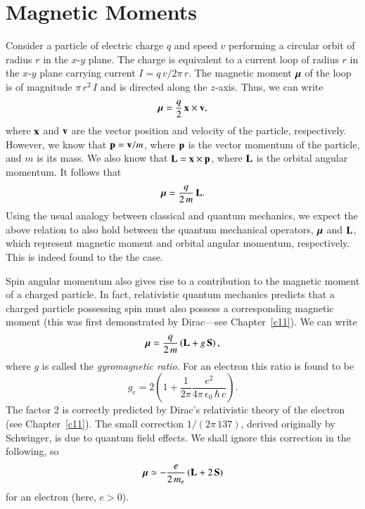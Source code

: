 \section{Magnetic Moments}\label{s5.5c}
Consider a particle of electric charge $q$ and speed $v$
performing  a  circular orbit of radius $r$ 
in the $x$-$y$ plane. The charge is equivalent to a current loop of radius $r$
in the $x$-$y$ plane carrying  current $I=q\,v/2\pi\, r$. The magnetic moment
$\mbox{\boldmath$\mu$}$  of
the loop is of magnitude $\pi\,  r^2\, I$ and is directed along the $z$-axis.
Thus, we can write
\begin{equation}
\mbox{\boldmath$\mu$} = \frac{q}{2}\, {\bf x} \times {\bf v},
\end{equation}
where ${\bf x}$ and ${\bf v}$ are the vector position and velocity of the particle,
respectively. However, we know that ${\bf p} = {\bf v} /m$, where ${\bf p}$
is the vector momentum of the particle, and $m$ is its mass. We also know that
${\bf L} = {\bf x}\times {\bf p}$, where ${\bf L}$ is the orbital angular momentum.
It follows that
\begin{equation}
\mbox{\boldmath$\mu$} = \frac{q}{2\,m} \,{\bf L}.
\end{equation}
Using the  usual analogy between classical and quantum mechanics, we 
expect the above relation to also hold between the quantum mechanical operators,
$\mbox{\boldmath$\mu$}$ and ${\bf L}$, which represent magnetic moment and orbital angular momentum,
respectively.
This is indeed found to the the case. 

Spin angular momentum also gives rise to a contribution to the magnetic
moment of a charged particle.  In fact, relativistic quantum
mechanics  predicts that a charged particle possessing spin  must also
possess a corresponding magnetic moment (this was first demonstrated by Dirac---see Chapter~\ref{c11}). We can write
\begin{equation}\label{e5.44r}
\mbox{\boldmath$\mu$}  = \frac{q}{2\,m} \left({\bf L} + g \,{\bf S}\right),
\end{equation}
where $g$ is called the {\em gyromagnetic ratio}. For an electron this ratio
is found to be
\begin{equation}
g_e = 2\left( 1 + \frac{1}{2\pi} \frac{e^2}{4\pi \,\epsilon_0\,\hbar \,c} \right).
\end{equation}
The factor 2 is correctly predicted by Dirac's relativistic theory of the electron (see Chapter~\ref{c11}).
The small correction $1/(2\pi\, 137)$, derived  originally by Schwinger, is due to
quantum field effects. We shall ignore this correction in the following,
so
\begin{equation}\label{e5.138}
\mbox{\boldmath$\mu$}  \simeq - \frac{e}{2\,m_e} \left({\bf L} + 2 \,{\bf S}\right)
\end{equation}
for an electron (here, $e>0$).

